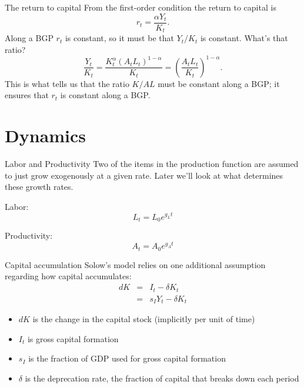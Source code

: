 \begin{frame}{The return to capital}
From the first-order condition the return to capital is
\begin{equation}
	r_t = \frac{\alpha Y_t}{K_t}. \label{EQ_r}
\end{equation}
Along a BGP $r_t$ is constant, so it must be that $Y_t/K_t$ is constant. What's that ratio?
\begin{equation}
	\frac{Y_t}{K_t} = \frac{K_t^{\alpha}(A_tL_t)^{1-\alpha}}{K_t} = \left(\frac{A_tL_t}{K_t}\right)^{1-\alpha}. \nonumber
\end{equation}
This is what tells us that the ratio $K/AL$ must be constant along a BGP; it ensures that $r_t$ is constant along a BGP.

\end{frame}

\section{Dynamics}
\begin{frame}{Labor and Productivity}
Two of the items in the production function are assumed to just grow exogenously at a given rate. Later we'll look at what determines these growth rates.

\vspace{.25in}\noindent Labor:
\begin{equation}
	L_t = L_0 e^{g_Lt} \label{EQ_L_gL}
\end{equation}

\vspace{.25in}\noindent Productivity:
\begin{equation}
	A_t = A_0e^{g_At} \label{EQ_A_gA}
\end{equation}
\end{frame}

\begin{frame}{Capital accumulation}
Solow's model relies on one additional assumption regarding how capital accumulates:
\begin{eqnarray}
	dK &=& I_t - \delta K_t \nonumber \\ 
	   &=& s_I Y_t - \delta K_t \label{EQ_dK}
\end{eqnarray}
\begin{itemize}
	\item $dK$ is the change in the capital stock (implicitly per unit of time)
	\item $I_t$ is gross capital formation 
	\item $s_I$ is the fraction of GDP used for gross capital formation
	\item $\delta$ is the deprecation rate, the fraction of capital that breaks down each period 
\end{itemize}

\end{frame}

